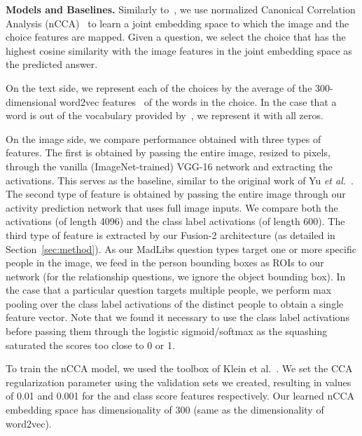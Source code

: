 \documentclass[runningheads]{llncs}
\begin{document}
{\bf Models and Baselines.}
Similarly to~\cite{yu2015visual}, we use normalized Canonical Correlation Analysis (nCCA)~\cite{gong2014multi} to learn a joint embedding space to which the image and the choice features are mapped. Given a question, we select the choice that has the highest cosine similarity with the image features in the joint embedding space as the predicted answer.

On the text side, we represent each of the choices by the average of the 300-dimensional word2vec features~\cite{mikolov2013distributed} of the words in the choice. In the case that a word is out of the vocabulary provided by~\cite{word2vec}, we represent it with all zeros. 

On the image side, we compare performance obtained with three types of features. The first is obtained by passing the entire image, resized to  pixels, through the vanilla (ImageNet-trained) VGG-16 network and extracting the  activations. This serves as the baseline, similar to the original work of Yu \emph{et al.}~\cite{yu2015visual}. The second type of feature is obtained by passing the entire image through our activity prediction network that uses full image inputs. We compare both the  activations (of length 4096) and the class label activations (of length 600). The third type of feature is extracted by our Fusion-2 architecture (as detailed in Section~\ref{sec:method}). As our MadLibs question types target one or more specific people in the image, we feed in the person bounding boxes as ROIs to our network (for the relationship questions, we ignore the object bounding box). In the case that a particular question targets multiple people, we perform max pooling over the class label activations of the distinct people to obtain a single feature vector. Note that we found it necessary to use the class label activations before passing them through the logistic sigmoid/softmax as the squashing saturated the scores too close to 0 or 1. 

To train the nCCA model, we used the toolbox of Klein et al.~\cite{klein2015associating}. We set the CCA regularization parameter using the validation sets we created, resulting in values of 0.01 and 0.001 for the  and class score features respectively. Our learned nCCA embedding space has dimensionality of 300 (same as the dimensionality of word2vec).
\end{document}
